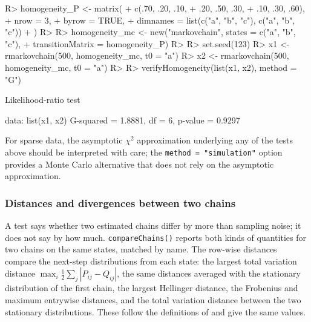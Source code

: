 \documentclass[
  nojss]{jss}
\begin{document}
\begin{CodeChunk}
\begin{CodeInput}
R> homogeneity_P <- matrix(
+   c(.70, .20, .10,
+     .20, .50, .30,
+     .10, .30, .60),
+   nrow = 3,
+   byrow = TRUE,
+   dimnames = list(c("a", "b", "c"), c("a", "b", "c"))
+ )
R> 
R> homogeneity_mc <- new("markovchain", states = c("a", "b", "c"),
+                       transitionMatrix = homogeneity_P)
R> 
R> set.seed(123)
R> x1 <- rmarkovchain(500, homogeneity_mc, t0 = "a")
R> x2 <- rmarkovchain(500, homogeneity_mc, t0 = "a")
R> 
R> verifyHomogeneity(list(x1, x2), method = "G")
\end{CodeInput}
\begin{CodeOutput}

    Likelihood-ratio test

data:  list(x1, x2)
G-squared = 1.8881, df = 6, p-value = 0.9297
\end{CodeOutput}
\end{CodeChunk}

For sparse data, the asymptotic \(\chi^2\) approximation underlying any of the tests above should be interpreted with care; the \texttt{method\ =\ "simulation"} option provides a Monte Carlo alternative that does not rely on the asymptotic approximation.

\subsubsection{Distances and divergences between two chains}\label{distances-and-divergences-between-two-chains}

A test says whether two estimated chains differ by more than sampling noise;
it does not say by how much. \texttt{compareChains()} reports both kinds of
quantities for two chains on the same states, matched by name. The
row-wise distances compare the next-step distributions from each state: the
largest total variation distance \(\max_i \frac12\sum_j|P_{ij}-Q_{ij}|\),
the same distances averaged with the stationary distribution of the first
chain, the largest Hellinger distance, the Frobenius and maximum entrywise
distances, and the total variation distance between the two stationary
distributions. These follow the definitions of  and give the
same values.
\end{document}
